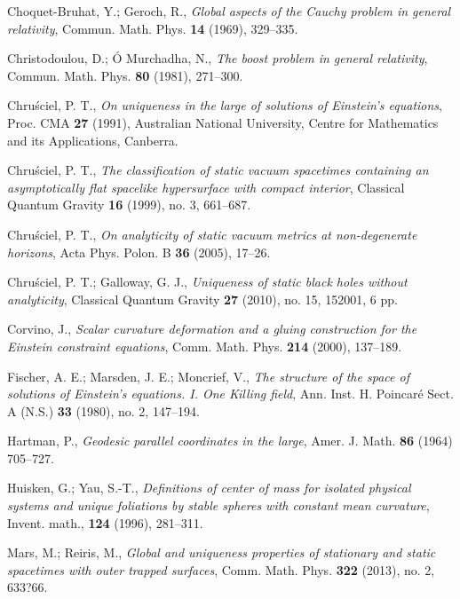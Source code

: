 \documentclass[12pt]{amsart}
\theoremstyle{remark}
\numberwithin{equation}{section}
\begin{document}
\begin{thebibliography}{10}
Choquet-Bruhat, Y.; Geroch, R.,
{\sl  Global aspects of the Cauchy problem in general relativity},
Commun. Math. Phys. \textbf{14} (1969), 329--335.

 Christodoulou, D.;  \'{O} Murchadha, N.,
 {\sl The boost problem in general relativity},  Commun. Math. Phys. \textbf{80}  (1981),  271--300.

 Chru{\'s}ciel, P. T.,
{\sl On uniqueness in the large of solutions of {E}instein's
              equations},  {Proc. CMA} \textbf{27}  (1991),  Australian National University, Centre for Mathematics and its
              Applications, Canberra.

 Chru{\'s}ciel, P. T.,
{\sl The classification of static vacuum spacetimes containing an asymptotically flat spacelike hypersurface with compact interior},
 Classical Quantum Gravity  \textbf{16}  (1999),  no. 3, 661--687.

 Chru{\'s}ciel, P. T., {\sl On analyticity of static vacuum metrics at non-degenerate  horizons},
Acta Phys. Polon. B  \textbf{36} (2005), 17--26.

 Chru{\'s}ciel, P. T.; Galloway, G. J.,
{\sl Uniqueness of static black holes without analyticity},
 Classical Quantum Gravity \textbf{27} (2010), no. 15, 152001, 6 pp.

 Corvino, J., {\sl Scalar curvature deformation and a gluing construction for the
Einstein constraint equations}, Comm. Math. Phys. \textbf{214} (2000), 137--189.

Fischer, A. E.;  Marsden, J. E.; Moncrief, V.,
{\sl The structure of the space of solutions of Einstein's equations. I. One Killing field},
Ann. Inst. H. Poincar\'{e} Sect. A (N.S.)  \textbf{33} (1980), no. 2, 147--194.

 Hartman, P., {\sl Geodesic parallel coordinates in the large}, Amer. J. Math. \textbf {86} (1964) 705--727.

 Huisken, G.; Yau, S.-T., {\sl Definitions of center of mass for isolated physical systems and unique foliations by stable spheres with constant mean curvature}, Invent. math., \textbf{124} (1996), 281--311.

 Mars, M.;  Reiris, M., {\sl Global and uniqueness properties of stationary and static spacetimes with outer trapped surfaces},
 Comm. Math. Phys.  \textbf{322}  (2013), no. 2, 633?66.


\end{thebibliography}
\end{document}
